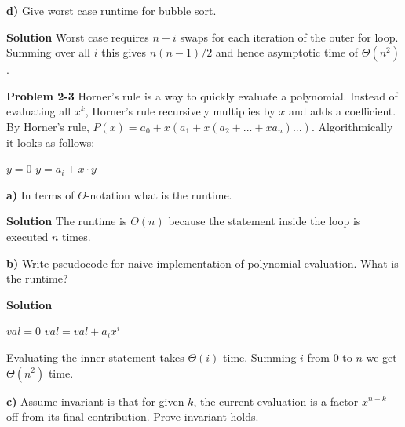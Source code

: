 \documentclass{article}
\begin{document}
\medskip

\textbf{d)} Give worst case runtime for bubble sort.

\medskip

\textbf{Solution} Worst case requires $n - i$ swaps for each iteration of the outer for loop. Summing over all $i$ this gives $n(n-1)/2$ and hence asymptotic time of $\boxed{\Theta(n^2)}$.

\hrulefill

\textbf{Problem 2-3} Horner's rule is a way to quickly evaluate a polynomial. Instead of evaluating all $x^k$, Horner's rule recursively multiplies by $x$ and adds a coefficient. By Horner's rule, $P(x) = a_0 + x(a_1 + x(a_2 + ... + xa_n)...)$. Algorithmically it looks as follows:

\begin{algorithm}
\begin{algorithmic}[1]
\State $y = 0$
	\State $y = a_i + x \cdot y$
\EndFor
\end{algorithmic}
\end{algorithm}

\medskip

\textbf{a)} In terms of $\Theta$-notation what is the runtime.

\medskip

\textbf{Solution} The runtime is $\Theta(n)$ because the statement inside the loop is executed $n$ times.

\medskip

\textbf{b)} Write pseudocode for naive implementation of polynomial evaluation. What is the runtime?

\medskip

\textbf{Solution}

\begin{algorithm}
\begin{algorithmic}[1]
\State $val = 0$
	\State $val = val + a_ix^i$
\EndFor
\end{algorithmic}
\end{algorithm}

Evaluating the inner statement takes $\Theta(i)$ time. Summing $i$ from $0$ to $n$ we get $\boxed{\Theta(n^2)}$ time.

\medskip

\textbf{c)} Assume invariant is that for given $k$, the current evaluation is a factor $x^{n-k}$ off from its final contribution. Prove invariant holds.

\medskip
\end{document}

